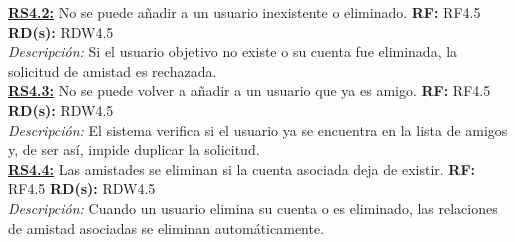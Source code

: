\textbf{\textcolor{verde}{\underline{RS4.2:}}} No se puede añadir a un usuario inexistente o eliminado. \textbf{RF:} RF4.5 \textbf{RD(s):} RDW4.5 \\ 
\hspace*{1cm} \textit{Descripción:} Si el usuario objetivo no existe o su cuenta fue eliminada, la solicitud de amistad es rechazada. \\[4pt]

\textbf{\textcolor{verde}{\underline{RS4.3:}}} No se puede volver a añadir a un usuario que ya es amigo. \textbf{RF:} RF4.5 \textbf{RD(s):} RDW4.5 \\ 
\hspace*{1cm} \textit{Descripción:} El sistema verifica si el usuario ya se encuentra en la lista de amigos y, de ser así, impide duplicar la solicitud. \\[4pt]

\textbf{\textcolor{verde}{\underline{RS4.4:}}} Las amistades se eliminan si la cuenta asociada deja de existir. \textbf{RF:} RF4.5 \textbf{RD(s):} RDW4.5 \\ 
\hspace*{1cm} \textit{Descripción:} Cuando un usuario elimina su cuenta o es eliminado, las relaciones de amistad asociadas se eliminan automáticamente.
\newpage
